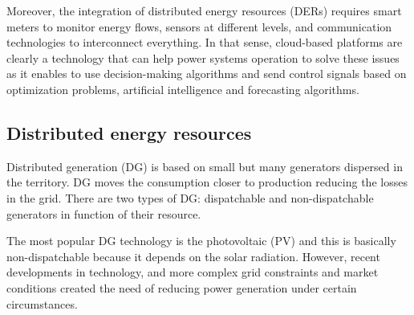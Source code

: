 Moreover, the integration of distributed energy resources (DERs) requires smart meters to monitor energy flows, sensors at different levels, and communication technologies to interconnect everything. 
In that sense, cloud-based platforms are clearly a technology that can help power systems operation to solve these issues as it enables to use decision-making algorithms and send control signals based on optimization problems, artificial intelligence and forecasting algorithms.

%
%
%

\subsection{Distributed energy resources}
Distributed generation (DG) is based on small but many generators dispersed in the territory. DG moves the consumption closer to production reducing the losses in the grid. 
There are two types of DG: dispatchable and non-dispatchable generators in function of their resource.

The most popular DG technology is the photovoltaic (PV) and this is basically non-dispatchable because it depends on the solar radiation. 
However, recent developments in technology, and more complex grid constraints and market conditions created the need of reducing power generation under certain circumstances.

